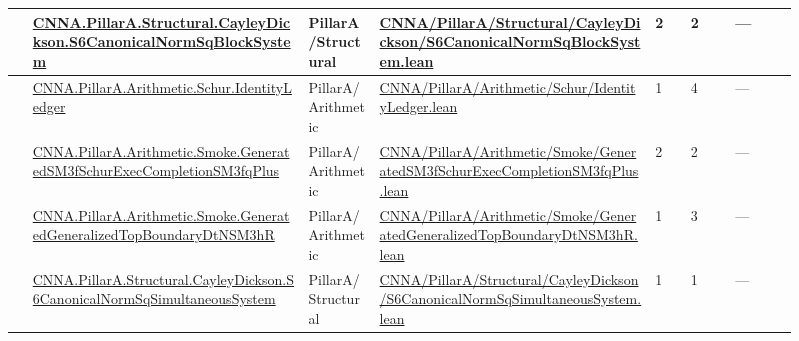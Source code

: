 \begin{longtable}{L{0.025\linewidth} L{0.315\linewidth} L{0.08\linewidth} L{0.315\linewidth} L{0.045\linewidth} L{0.055\linewidth} L{0.07\linewidth}}
\hline
{} & \href{run:repo_snapshot/CNNA/PillarA/Structural/CayleyDickson/S6CanonicalNormSqBlockSystem.lean}{CNNA.\allowbreak{}PillarA.\allowbreak{}Structural.\allowbreak{}CayleyDickson.\allowbreak{}S6CanonicalNormSqBlockSystem} & PillarA/\allowbreak{}Structural & \href{run:repo_snapshot/CNNA/PillarA/Structural/CayleyDickson/S6CanonicalNormSqBlockSystem.lean}{CNNA/\allowbreak{}PillarA/\allowbreak{}Structural/\allowbreak{}CayleyDickson/\allowbreak{}S6CanonicalNormSqBlockSystem.\allowbreak{}lean} & 2 & 2 & ---\\
\hline
{} & \href{run:repo_snapshot/CNNA/PillarA/Arithmetic/Schur/IdentityLedger.lean}{CNNA.\allowbreak{}PillarA.\allowbreak{}Arithmetic.\allowbreak{}Schur.\allowbreak{}IdentityLedger} & PillarA/\allowbreak{}Arithmetic & \href{run:repo_snapshot/CNNA/PillarA/Arithmetic/Schur/IdentityLedger.lean}{CNNA/\allowbreak{}PillarA/\allowbreak{}Arithmetic/\allowbreak{}Schur/\allowbreak{}IdentityLedger.\allowbreak{}lean} & 1 & 4 & ---\\
\hline
{} & \href{run:repo_snapshot/CNNA/PillarA/Arithmetic/Smoke/GeneratedSM3fSchurExecCompletionSM3fqPlus.lean}{CNNA.\allowbreak{}PillarA.\allowbreak{}Arithmetic.\allowbreak{}Smoke.\allowbreak{}GeneratedSM3fSchurExecCompletionSM3fqPlus} & PillarA/\allowbreak{}Arithmetic & \href{run:repo_snapshot/CNNA/PillarA/Arithmetic/Smoke/GeneratedSM3fSchurExecCompletionSM3fqPlus.lean}{CNNA/\allowbreak{}PillarA/\allowbreak{}Arithmetic/\allowbreak{}Smoke/\allowbreak{}GeneratedSM3fSchurExecCompletionSM3fqPlus.\allowbreak{}lean} & 2 & 2 & ---\\
\hline
{} & \href{run:repo_snapshot/CNNA/PillarA/Arithmetic/Smoke/GeneratedGeneralizedTopBoundaryDtNSM3hR.lean}{CNNA.\allowbreak{}PillarA.\allowbreak{}Arithmetic.\allowbreak{}Smoke.\allowbreak{}GeneratedGeneralizedTopBoundaryDtNSM3hR} & PillarA/\allowbreak{}Arithmetic & \href{run:repo_snapshot/CNNA/PillarA/Arithmetic/Smoke/GeneratedGeneralizedTopBoundaryDtNSM3hR.lean}{CNNA/\allowbreak{}PillarA/\allowbreak{}Arithmetic/\allowbreak{}Smoke/\allowbreak{}GeneratedGeneralizedTopBoundaryDtNSM3hR.\allowbreak{}lean} & 1 & 3 & ---\\
\hline
{} & \href{run:repo_snapshot/CNNA/PillarA/Structural/CayleyDickson/S6CanonicalNormSqSimultaneousSystem.lean}{CNNA.\allowbreak{}PillarA.\allowbreak{}Structural.\allowbreak{}CayleyDickson.\allowbreak{}S6CanonicalNormSqSimultaneousSystem} & PillarA/\allowbreak{}Structural & \href{run:repo_snapshot/CNNA/PillarA/Structural/CayleyDickson/S6CanonicalNormSqSimultaneousSystem.lean}{CNNA/\allowbreak{}PillarA/\allowbreak{}Structural/\allowbreak{}CayleyDickson/\allowbreak{}S6CanonicalNormSqSimultaneousSystem.\allowbreak{}lean} & 1 & 1 & ---\\

\end{longtable}
